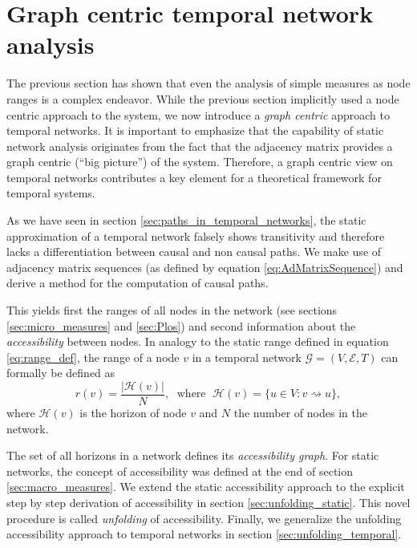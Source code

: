 \section{Graph centric temporal network analysis}\label{sec:PRL}
The previous section has shown that even the analysis of simple measures as node ranges is a complex endeavor.
While the previous section implicitly used a node centric approach to the system, we now introduce a \emph{graph centric} approach to temporal networks.
It is important to emphasize that the capability of static network analysis originates from the fact that the adjacency matrix provides a graph centric (``big picture'') of the system.
Therefore, a graph centric view on temporal networks contributes a key element for a theoretical framework for temporal systems.

As we have seen in section \ref{sec:paths_in_temporal_networks}, the static approximation of a temporal network falsely shows transitivity and therefore lacks a differentiation between causal and non causal paths.
We make use of adjacency matrix sequences (as defined by equation \eqref{eq:AdMatrixSequence}) and derive a method for the computation of causal paths.

This yields first the ranges of all nodes in the network (see sections \ref{sec:micro_measures} and \ref{sec:Plos}) and second information about the \emph{accessibility} between nodes.
In analogy to the static range defined in equation \eqref{eq:range_def}, the range of a node $v$ in a temporal network $\mathcal{G}=(V,\mathcal{E},T)$ can formally be defined as
\begin{equation}\label{eq:temporal_range_def}
r(v)=\frac{\left| \mathcal{H}(v) \right| }{N}, \; \text{ where } \; \mathcal{H}(v)=\{u \in V: v\rightsquigarrow u \},
\end{equation}
where $\mathcal{H}(v)$ is the horizon of node $v$ and $N$ the number of nodes in the network.

The set of all horizons in a network defines its \emph{accessibility graph}.
For static networks, the concept of accessibility was defined at the end of section \ref{sec:macro_measures}.
We extend the static accessibility approach to the explicit step by step derivation of accessibility in section \ref{sec:unfolding_static}.
This novel procedure is called \emph{unfolding} of accessibility.
Finally, we generalize the unfolding accessibility approach to temporal networks in section \ref{sec:unfolding_temporal}.

